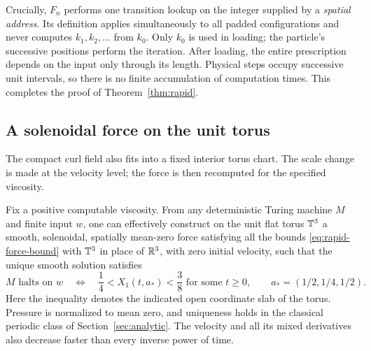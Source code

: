 Crucially, $F_n$ performs one transition lookup on the integer supplied
by a \emph{spatial address}.  Its definition applies simultaneously to
all padded configurations and never computes $k_1,k_2,\ldots$ from
$k_0$.  Only $k_0$ is used in loading; the particle's successive positions
perform the iteration.  After loading, the entire prescription depends
on the input only through its length.  Physical steps occupy successive
unit intervals, so there is no finite accumulation of computation times.
This completes the proof of Theorem~\ref{thm:rapid}.

\subsection{A solenoidal force on the unit torus}

The compact curl field also fits into a fixed interior torus chart.
The scale change is made at the velocity level; the force is then recomputed
for the specified viscosity.

\begin{corollary}
\label{cor:rapid-torus}
Fix a positive computable viscosity.  From any deterministic Turing
machine $M$ and finite input $w$, one can effectively construct on the
unit flat torus $\mathbb T^3$ a smooth, solenoidal, spatially mean-zero
force satisfying all the bounds \eqref{eq:rapid-force-bound} with $\mathbb T^3$
in place of $\mathbb R^3$, with zero
initial velocity, such that the unique smooth solution satisfies
\[
 M\text{ halts on }w
 \quad\Longleftrightarrow\quad
 \frac14<X_1(t,a_*)<\frac38\text{ for some }t\geq0,
 \qquad a_*=(1/2,1/4,1/2).
\]
Here the inequality denotes the indicated open coordinate slab of the
torus. Pressure is normalized to mean zero, and uniqueness holds in the
classical periodic class of Section~\ref{sec:analytic}.  The velocity and all its mixed derivatives also decrease faster
than every inverse power of time.
\end{corollary}

